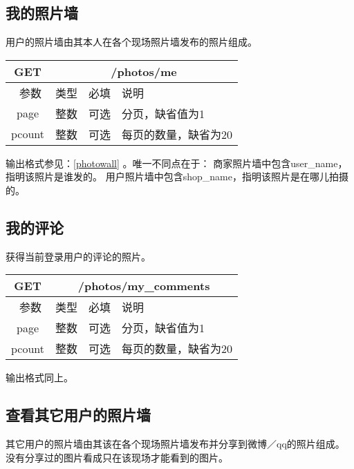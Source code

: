 \subsection{我的照片墙}
用户的照片墙由其本人在各个现场照片墙发布的照片组成。

\begin{table}[H]
   \begin{center}
\begin{tabular}{|c|c|c|p{12cm}|}
\hline
GET & \multicolumn{3}{|c|}{/photos/me} \\
\hline\hline
 \  参数  & 类型 & 必填 &  说明  \\
\hline
 page  & 整数 & 可选 & 分页，缺省值为1\\ 
 \hline
 pcount  & 整数 & 可选 & 每页的数量，缺省为20\\ 
\hline
\end{tabular}
   \end{center}
\end{table}

输出格式参见：\ref{photowall} 。唯一不同点在于：
商家照片墙中包含user\_name，指明该照片是谁发的。
用户照片墙中包含shop\_name，指明该照片是在哪儿拍摄的。


\subsection{我的评论}
获得当前登录用户的评论的照片。

\begin{table}[H]
   \begin{center}
\begin{tabular}{|c|c|c|p{12cm}|}
\hline
GET & \multicolumn{3}{|c|}{/photos/my\_comments} \\
\hline\hline
 \  参数  & 类型 & 必填 &  说明  \\
\hline
 page  & 整数 & 可选 & 分页，缺省值为1\\ 
 \hline
 pcount  & 整数 & 可选 & 每页的数量，缺省为20\\ 
\hline
\end{tabular}
   \end{center}
\end{table}

输出格式同上。


\subsection{查看其它用户的照片墙}
其它用户的照片墙由其该在各个现场照片墙发布并分享到微博／qq的照片组成。没有分享过的图片看成只在该现场才能看到的图片。

